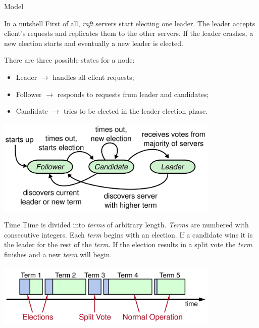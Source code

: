 \documentclass[presentation]{beamer}\mode<presentation>{\usetheme{AMSBolognaFC}}
\begin{document}
\begin{frame}[allowframebreaks]{Model}
    
    \begin{block}{In a nutshell}
        First of all, \emph{raft} servers start electing one leader.
        The leader accepts client's requests and replicates them to the other servers.
        If the leader crashes, a new election starts and eventually a new leader is elected.
    \end{block}
    
    \framebreak
    
    There are three possible states for a node:
    \begin{itemize}
        \item \alert{Leader}  $\rightarrow$ handles all client requests;
        \item \alert{Follower} $\rightarrow$ responds to requests from leader and candidates;
        \item \alert{Candidate} $\rightarrow$ tries to be elected in the leader election phase.
    \end{itemize}

    \centering
    \includegraphics[width=0.8\textwidth]{figures/node-state-diagram.png}
    
    \framebreak
    
     \begin{block}{Time}
        Time is divided into \alert{\emph{terms}} of arbitrary length.
        \emph{Terms} are numbered with consecutive integers.
        Each \emph{term} begins with an election.
        If a candidate wins it is the leader for the rest of the \emph{term}.
        If the election results in a split vote the \emph{term} finishes and a new \emph{term} will begin.
    \end{block}

    \centering
    \includegraphics[width=0.8\textwidth]{figures/time.png}
    

\end{frame}
\end{document}
